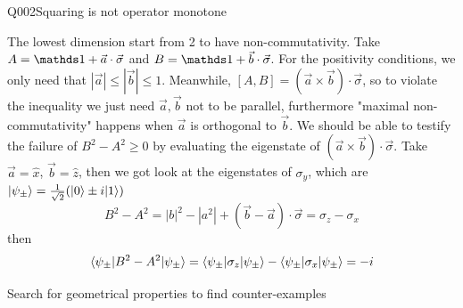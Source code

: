 \begin{entry}{Q002}{Squaring is not operator monotone}
\begin{solution}[Part (b)]
The lowest dimension start from 2 to have non-commutativity. Take $A= \id  + \vec{a}\cdot\vec{\sigma}$ and $B= \id  + \vec{b}\cdot\vec{\sigma}$. For the positivity conditions, we only need that $|\vec a| \leq|\vec b| \leq 1$. Meanwhile, $[A,B]= (\vec{a}\times \vec b)\cdot\vec \sigma$, so to violate the inequality we just need $\vec{a},\vec b$ not to be parallel, furthermore "maximal non-commutativity" happens when $\vec{a}$ is orthogonal to $\vec b$. We should be able to testify the failure of $B^2-A^2\geq 0$ by evaluating the eigenstate of $(\vec{a}\times \vec b)\cdot\vec \sigma$.
Take $\vec a = \hat x$, $\vec b = \hat z$, then we got look at the eigenstates of $\sigma_y$, which are $\lvert \psi_{\pm} \rangle=\frac{1}{\sqrt{2}}(\lvert 0 \rangle\pm i\lvert 1 \rangle)$
\begin{equation}
    B^2 -A^2 = |b|^2 - |a^2| + (\vec{b} -\vec a)\cdot\vec \sigma = \sigma_z -\sigma_x
\end{equation}
then 
\begin{equation}
    \langle \psi_{\pm} \vert B^2 -A^2 \vert \psi_{\pm} \rangle= \langle \psi_{\pm} \vert \sigma_z \vert \psi_{\pm} \rangle - \langle \psi_{\pm} \vert \sigma_x \vert \psi_{\pm} \rangle = -i
\end{equation}
\end{solution}

\begin{takeaway}
Search for geometrical properties to find counter-examples
\end{takeaway}


\end{entry}
